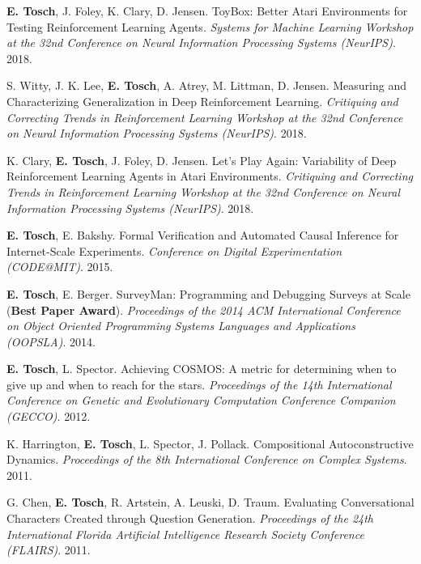 \documentclass[10pt]{article}
\newcommand{\cvsec}[2]{
    \begin{tcolorbox}[width=\textwidth, breakable, title={#1}]
        #2
    \end{tcolorbox}
    \vspace{10pt}
}
\newcommand{\pub}[4]{
  \parbox{\textwidth}{
    #1. #2. \textit{#3}. #4.
    \vspace{5pt}
  }
}
\newcommand{\me}{\textbf{E. Tosch}}
\begin{document}
\cvsec{Publications}{
  \pub{\me{}, J. Foley, K. Clary, D. Jensen}{ToyBox: Better Atari Environments for Testing Reinforcement Learning Agents}{Systems for Machine Learning Workshop at the 32nd Conference on Neural Information Processing Systems (NeurIPS)}{2018}
  \pub{S. Witty, J. K. Lee, \me{}, A. Atrey, M. Littman, D. Jensen}{Measuring and Characterizing Generalization in Deep Reinforcement Learning}{Critiquing and Correcting Trends in Reinforcement Learning Workshop at the 32nd Conference on Neural Information Processing Systems (NeurIPS)}{2018}
  \pub{K. Clary, \me{}, J. Foley, D. Jensen}{Let's Play Again: Variability of Deep Reinforcement Learning Agents in Atari Environments}{Critiquing and Correcting Trends in Reinforcement Learning Workshop at the 32nd Conference on Neural Information Processing Systems (NeurIPS)}{2018}
  \pub{\me{}, E. Bakshy}{Formal Verification and Automated Causal Inference for Internet-Scale Experiments}{Conference on Digital Experimentation (CODE@MIT)}{2015}
  \pub{\me{}, E. Berger}{SurveyMan: Programming and Debugging Surveys at Scale (\textbf{Best Paper Award})}{Proceedings of the 2014 ACM International Conference on Object Oriented Programming Systems Languages and Applications (OOPSLA)}{2014}
  \pub{\me{}, L. Spector}{Achieving COSMOS: A metric for determining when to give up and when to reach for the stars}{Proceedings of the 14th International Conference on Genetic and Evolutionary Computation Conference Companion (GECCO)}{2012}
  \pub{K. Harrington, \me{}, L. Spector, J. Pollack}{Compositional Autoconstructive Dynamics}{Proceedings of the 8th International Conference on Complex Systems}{2011}
  \pub{G. Chen, \me{}, R. Artstein, A. Leuski, D. Traum}{Evaluating Conversational Characters Created through Question Generation}{Proceedings of the 24th International Florida Artificial Intelligence Research Society Conference (FLAIRS)}{2011}
}
\end{document}
